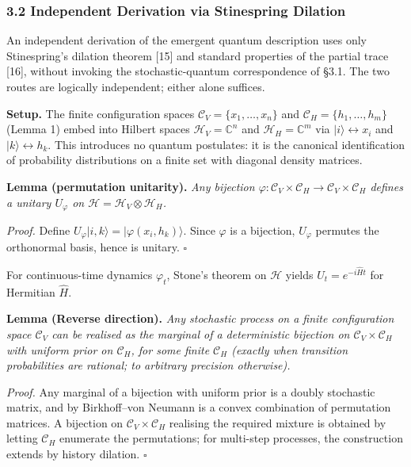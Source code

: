 \documentclass[
]{article}
\begin{document}
\hypertarget{independent-derivation-via-stinespring-dilation}{%
\subsubsection{3.2 Independent Derivation via Stinespring
Dilation}\label{independent-derivation-via-stinespring-dilation}}

An independent derivation of the emergent quantum description uses only
Stinespring's dilation theorem {[}15{]} and standard properties of the
partial trace {[}16{]}, without invoking the stochastic-quantum
correspondence of §3.1. The two routes are logically independent; either
alone suffices.

\textbf{Setup.} The finite configuration spaces
\(\mathcal{C}_V = \{x_1, \ldots, x_n\}\) and
\(\mathcal{C}_H = \{h_1, \ldots, h_m\}\) (Lemma 1) embed into Hilbert
spaces \(\mathcal{H}_V = \mathbb{C}^n\) and
\(\mathcal{H}_H = \mathbb{C}^m\) via \(|i\rangle \leftrightarrow x_i\)
and \(|k\rangle \leftrightarrow h_k\). This introduces no quantum
postulates: it is the canonical identification of probability
distributions on a finite set with diagonal density matrices.

\textbf{Lemma (permutation unitarity).} \emph{Any bijection
\(\varphi: \mathcal{C}_V \times \mathcal{C}_H \to \mathcal{C}_V \times \mathcal{C}_H\)
defines a unitary \(U_\varphi\) on
\(\mathcal{H} = \mathcal{H}_V \otimes \mathcal{H}_H\).}

\emph{Proof.} Define
\(U_\varphi |i, k\rangle = |\varphi(x_i, h_k)\rangle\). Since
\(\varphi\) is a bijection, \(U_\varphi\) permutes the orthonormal
basis, hence is unitary. \(\square\)

For continuous-time dynamics \(\varphi_t\), Stone's theorem on
\(\mathcal{H}\) yields \(U_t = e^{-i\hat{H}t}\) for Hermitian
\(\hat{H}\).

\textbf{Lemma (Reverse direction).} \emph{Any stochastic process on a
finite configuration space \(\mathcal{C}_V\) can be realised as the
marginal of a deterministic bijection on
\(\mathcal{C}_V \times \mathcal{C}_H\) with uniform prior on
\(\mathcal{C}_H\), for some finite \(\mathcal{C}_H\) (exactly when
transition probabilities are rational; to arbitrary precision
otherwise).}

\emph{Proof.} Any marginal of a bijection with uniform prior is a doubly
stochastic matrix, and by Birkhoff--von Neumann is a convex combination
of permutation matrices. A bijection on
\(\mathcal{C}_V \times \mathcal{C}_H\) realising the required mixture is
obtained by letting \(\mathcal{C}_H\) enumerate the permutations; for
multi-step processes, the construction extends by history dilation.
\(\square\)
\end{document}

